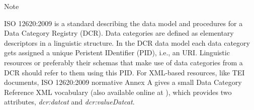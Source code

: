 \begin{reflist}
    \item[{Note}]
  \par
ISO 12620:2009 is a standard describing the data model and procedures for a Data Category Registry (DCR). Data categories are defined as elementary descriptors in a linguistic structure. In the DCR data model each data category gets assigned a unique Peristent IDentifier (PID), i.e., an URI. Linguistic resources or preferably their schemas that make use of data categories from a DCR should refer to them using this PID. For XML-based resources, like TEI documents, ISO 12620:2009 normative Annex A gives a small Data Category Reference XML vocabulary (also available online at ), which provides two attributes, {\itshape dcr:datcat} and {\itshape dcr:valueDatcat}.
\end{reflist}  
